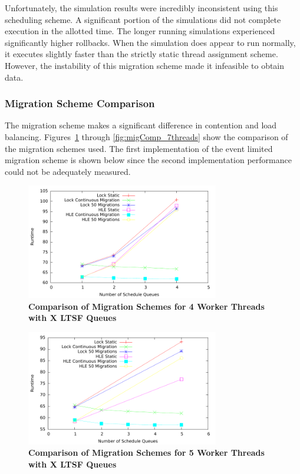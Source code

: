 \documentclass[11pt]{book}
\begin{document}
Unfortunately, the simulation results were incredibly inconsistent using this
scheduling scheme.  A significant portion of the simulations did not complete
execution in the allotted time.  The longer running simulations experienced
significantly higher rollbacks.  When the simulation does appear to run
normally, it executes slightly faster than the strictly static thread assignment
scheme.  However, the instability of this migration scheme made it infeasible to
obtain data.

\subsubsection{Migration Scheme Comparison}

The migration scheme makes a significant difference in contention and load
balancing.  Figures~\ref{fig:migComp_4threads} through
\ref{fig:migComp_7threads} show the comparison of the migration schemes used.
The first implementation of the event limited migration scheme is shown below
since the second implementation performance could not be adequately measured.

\begin{figure}
    \centering
    \graphicspath{ {./figures/} }
    \includegraphics[width=0.75\textwidth,keepaspectratio]{migComp_4threads}
    \caption{\textbf{Comparison of Migration Schemes for 4 Worker Threads with X LTSF
        Queues}}\label{fig:migComp_4threads}
\end{figure}

\begin{figure}
    \centering
    \graphicspath{ {./figures/} }
    \includegraphics[width=0.75\textwidth,keepaspectratio]{migComp_5threads}
    \caption{\textbf{Comparison of Migration Schemes for 5 Worker Threads with X LTSF
        Queues}}\label{fig:migComp_5threads}
\end{figure}
\end{document}
